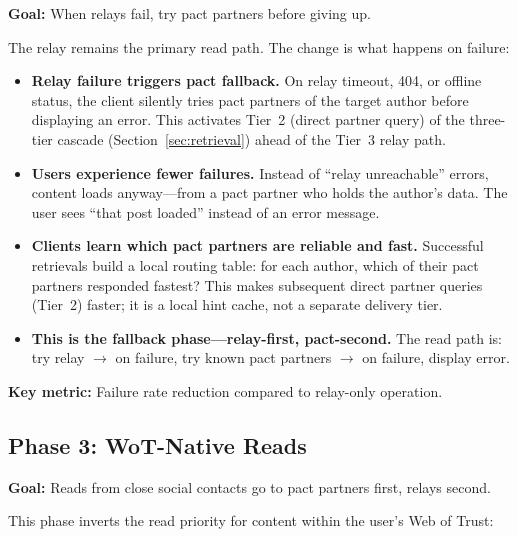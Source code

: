 \documentclass[11pt,a4paper]{article}
\begin{document}
\textbf{Goal:} When relays fail, try pact partners before giving up.

The relay remains the primary read path. The change is what happens on failure:

\begin{itemize}
  \item \textbf{Relay failure triggers pact fallback.} On relay timeout, 404, or offline status, the client silently tries pact partners of the target author before displaying an error. This activates Tier~2 (direct partner query) of the three-tier cascade (Section~\ref{sec:retrieval}) ahead of the Tier~3 relay path.
  \item \textbf{Users experience fewer failures.} Instead of ``relay unreachable'' errors, content loads anyway---from a pact partner who holds the author's data. The user sees ``that post loaded'' instead of an error message.
  \item \textbf{Clients learn which pact partners are reliable and fast.} Successful retrievals build a local routing table: for each author, which of their pact partners responded fastest? This makes subsequent direct partner queries (Tier~2) faster; it is a local hint cache, not a separate delivery tier.
  \item \textbf{This is the fallback phase---relay-first, pact-second.} The read path is: try relay $\to$ on failure, try known pact partners $\to$ on failure, display error.
\end{itemize}

\textbf{Key metric:} Failure rate reduction compared to relay-only operation.

\subsection{Phase 3: WoT-Native Reads}

\textbf{Goal:} Reads from close social contacts go to pact partners first, relays second.

This phase inverts the read priority for content within the user's Web of Trust:
\end{document}
